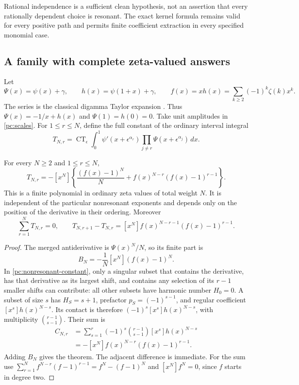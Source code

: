 Rational independence is a sufficient clean hypothesis, not an assertion
that every rationally dependent choice is resonant.  The exact kernel
formula remains valid for every positive path and permits finite
coefficient extraction in every specified monomial case.

\subsection{A family with complete zeta-valued answers}

Let
\[
 \Psi(x)=\psi(x)+\gamma,\qquad
 h(x)=\psi(1+x)+\gamma,\qquad
 f(x)=xh(x)=\sum_{k\ge2}(-1)^k\zeta(k)x^k.
\]
The series is the classical digamma Taylor expansion
\cite[Eq.~5.7.4]{DLMF}.
Thus $\Psi(x)=-1/x+h(x)$ and $\Psi(1)=h(0)=0$.
Take unit amplitudes in \eqref{pc:scales}.  For $1\le r\le N$,
define the full constant of the ordinary interval integral
\begin{equation}\label{pc:T-def}
 T_{N,r}=\operatorname{CT}_{\epsilon}
       \int_0^1\psi'(x+\epsilon^{\alpha_r})
               \prod_{j\ne r}\Psi(x+\epsilon^{\alpha_j})\,dx.
\end{equation}

\begin{theorem}
\label{pc:all-powers}
For every $N\ge2$ and $1\le r\le N$,
\begin{equation}\label{pc:all-powers-formula}
 \boxed{\displaystyle
 T_{N,r}=-[x^N]\left\{
           \frac{(f(x)-1)^N}{N}
               +f(x)^{N-r}(f(x)-1)^{r-1}\right\}.}
\end{equation}
This is a finite polynomial in ordinary zeta values of total weight $N$.
It is independent of the particular nonresonant exponents and depends
only on the position of the derivative in their ordering.  Moreover
\begin{equation}\label{pc:sum-jump}
 \sum_{r=1}^N T_{N,r}=0,\qquad
 T_{N,r+1}-T_{N,r}
       =[x^N]f(x)^{N-r-1}(f(x)-1)^{r-1}.
\end{equation}
\end{theorem}

\begin{proof}
The merged antiderivative is $\Psi(x)^N/N$, so its finite part is
\[
 B_N=-\frac1N[x^N](f(x)-1)^N.
\]
In \eqref{pc:nonresonant-constant}, only a singular subset that
contains the derivative, has that derivative as its largest shift,
and contains any selection of its $r-1$ smaller shifts can contribute:
all other subsets have harmonic number $H_0=0$.
A subset of size $s$ has $H_S=s+1$, prefactor $p_S=(-1)^{s-1}$,
and regular coefficient $[x^s]h(x)^{N-s}$.  Its contact is therefore
$(-1)^s[x^s]h(x)^{N-s}$, with multiplicity $\binom{r-1}{s-1}$.
Their sum is
\begin{align*}
 C_{N,r}
 &=\sum_{s=1}^r(-1)^s\binom{r-1}{s-1}
                           [x^s]h(x)^{N-s}\\
 &=-[x^N]f(x)^{N-r}(f(x)-1)^{r-1}.
\end{align*}
Adding $B_N$ gives the theorem.  The adjacent difference is immediate.
For the sum use
$\sum_{r=1}^N f^{N-r}(f-1)^{r-1}=f^N-(f-1)^N$ and
$[x^N]f^N=0$, since $f$ starts in degree two.
\end{proof}

